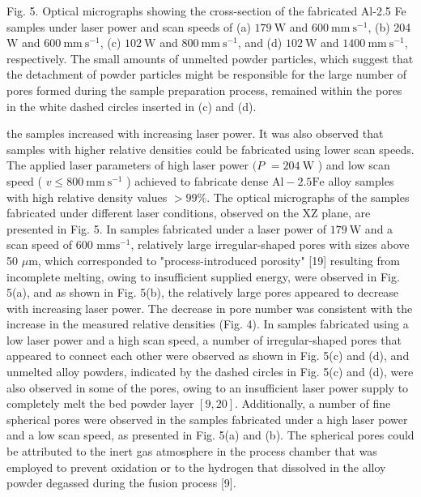 \documentclass[10pt]{article}
\begin{document}
Fig. 5. Optical micrographs showing the cross-section of the fabricated Al-2.5 Fe samples under laser power and scan speeds of (a) $179 \mathrm{~W}$ and $600 \mathrm{~mm} \mathrm{~s}{ }^{-1}$, (b) 204 $\mathrm{W}$ and $600 \mathrm{~mm} \mathrm{~s}^{-1}$, (c) $102 \mathrm{~W}$ and $800 \mathrm{~mm} \mathrm{~s}^{-1}$, and (d) $102 \mathrm{~W}$ and $1400 \mathrm{~mm} \mathrm{~s}^{-1}$, respectively. The small amounts of unmelted powder particles, which suggest that the detachment of powder particles might be responsible for the large number of pores formed during the sample preparation process, remained within the pores in the white dashed circles inserted in (c) and (d).

the samples increased with increasing laser power. It was also observed that samples with higher relative densities could be fabricated using lower scan speeds. The applied laser parameters of high laser power $(P$ $=204 \mathrm{~W}$ ) and low scan speed ( $v \leq 800 \mathrm{~mm} \mathrm{~s}^{-1}$ ) achieved to fabricate dense $\mathrm{Al}-2.5 \mathrm{Fe}$ alloy samples with high relative density values $>99 \%$. The optical micrographs of the samples fabricated under different laser conditions, observed on the XZ plane, are presented in Fig. 5. In samples fabricated under a laser power of $179 \mathrm{~W}$ and a scan speed of 600 $\mathrm{mm} \mathrm{s}^{-1}$, relatively large irregular-shaped pores with sizes above 50 $\mu \mathrm{m}$, which corresponded to "process-introduced porosity" [19] resulting from incomplete melting, owing to insufficient supplied energy, were observed in Fig. 5(a), and as shown in Fig. 5(b), the relatively large pores appeared to decrease with increasing laser power. The decrease in pore number was consistent with the increase in the measured relative densities (Fig. 4). In samples fabricated using a low laser power and a high scan speed, a number of irregular-shaped pores that appeared to connect each other were observed as shown in Fig. 5(c) and (d), and unmelted alloy powders, indicated by the dashed circles in Fig. 5(c) and (d), were also observed in some of the pores, owing to an insufficient laser power supply to completely melt the bed powder layer $[9,20]$. Additionally, a number of fine spherical pores were observed in the samples fabricated under a high laser power and a low scan speed, as presented in Fig. 5(a) and (b). The spherical pores could be attributed to the inert gas atmosphere in the process chamber that was employed to prevent oxidation or to the hydrogen that dissolved in the alloy powder degassed during the fusion process [9].
\end{document}

